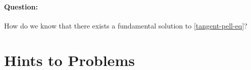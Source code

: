 \documentclass[../jarvis.tex]{subfiles}
\begin{document}
\paragraph{Question:} How do we know that there exists a fundamental solution to \eqref{tangent-pell-eq}?

\section{Hints to Problems}
\printhint
\end{document}
